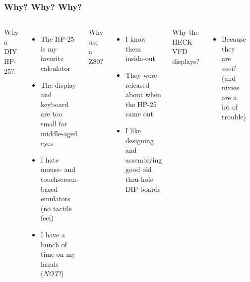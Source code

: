 \documentclass{beamer}
\newcommand{\tblue}[1]{\textcolor{my-blue}{#1}}
\begin{document}
\begin{frame}
  \frametitle{Why? Why? Why?}

  \begin{columns}
  \tblue{Why a DIY HP-25?}

    \begin{itemize}
    \scriptsize
    \item The HP-25 is my favorite calculator
    \item The display and keyboard are too small for middle-aged eyes
    \item I hate mouse- and touchscreen-based emulators \\ (no tactile feel)
    \item I have a bunch of time on my hands ({\em NOT!})
    \end{itemize}
    \vskip 0.1in
  
    \tblue{Why use a Z80?}
  
    \begin{itemize}
    \scriptsize
    \item I know them inside-out
    \item They were released about when the HP-25 came out
    \item I like designing and assemblying good old thru-hole DIP boards
    \end{itemize}
    \vskip 0.1in
  
    \tblue{Why the HECK VFD displays?}
    \begin{itemize}
    \scriptsize
    \item Because they are {\em cool!} \\
     (and nixies are a lot of trouble)
    \end{itemize}


    \includegraphics[width=0.7in]{figs/hp-25.jpg}
    \vskip 0.1in
    \includegraphics[width=1in]{figs/z80.jpg}
    \vskip 0.3in
    \includegraphics[width=1in]{figs/vfd.png}

  \end{columns}
\end{frame}
\end{document}
